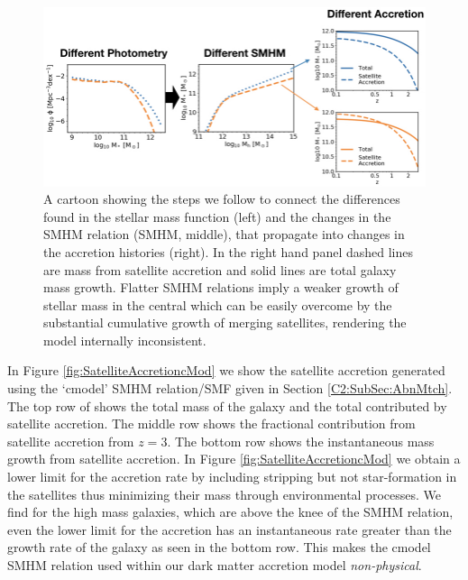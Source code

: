 \begin{figure}[h]
	\centering
	\includegraphics[width = \linewidth]{Figures/Chapter4/SMFtoAccretion.jpeg}
    \caption{A cartoon showing the steps we follow to connect the differences found in the stellar mass function (left) and the changes in the SMHM relation (SMHM, middle), that propagate into changes in the accretion histories (right). In the right hand panel dashed lines are mass from satellite accretion and solid lines are total galaxy mass growth. Flatter SMHM relations imply a weaker growth of stellar mass in the central which can be easily overcome by the substantial cumulative growth of merging satellites, rendering the model internally inconsistent.}
	\label{fig:SMFtoAcc}
\end{figure}

In Figure \ref{fig:SatelliteAccretioncMod} we show the satellite accretion generated using the `cmodel' SMHM relation/SMF given in Section \ref{C2:SubSec:AbnMtch}. 
The top row of  shows the total mass of the galaxy and the total contributed by satellite accretion. The middle row shows the fractional contribution from satellite accretion from $z = 3$. The bottom row shows the instantaneous mass growth from satellite accretion. In Figure \ref{fig:SatelliteAccretioncMod} we obtain a lower limit for the accretion rate by including stripping but not star-formation in the satellites thus minimizing their mass through environmental processes. We find for the high mass galaxies, which are above the knee of the SMHM relation, even the lower limit for the accretion has an instantaneous rate greater than the growth rate of the galaxy as seen in the bottom row. This makes the cmodel SMHM relation used within our dark matter accretion model \textit{non-physical}.

